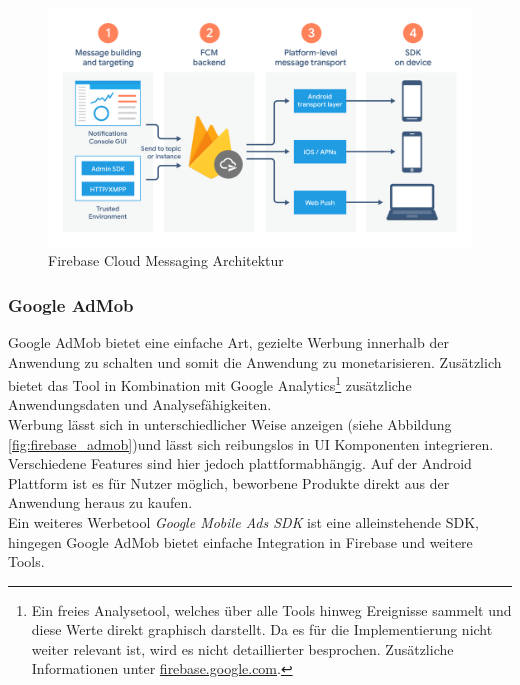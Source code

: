 \begin{figure}[htb]
	\begin{center}
		\includegraphics[scale=0.23]{Theoretische_Grundlagen/images/firebase_cloudmessaging_architecture.png}
	\end{center}
	\caption{Firebase Cloud Messaging Architektur}
	\label{fig:cloudmessaging_architecture}
\end{figure}

\subsubsection{Google AdMob}
Google AdMob bietet eine einfache Art, gezielte Werbung innerhalb der Anwendung zu schalten und somit die Anwendung zu monetarisieren.
Zusätzlich bietet das Tool in Kombination mit Google Analytics\footnote{Ein freies Analysetool, welches über alle Tools hinweg Ereignisse sammelt und diese Werte direkt graphisch darstellt. Da es für die Implementierung nicht weiter relevant ist, wird es nicht detaillierter besprochen. Zusätzliche Informationen unter \href{https://firebase.google.com/docs/analytics}{firebase.google.com}.} zusätzliche Anwendungsdaten und Analysefähigkeiten.\\
Werbung lässt sich in unterschiedlicher Weise anzeigen (siehe Abbildung \ref{fig:firebase_admob})und lässt sich reibungslos in UI Komponenten integrieren. 
Verschiedene Features sind hier jedoch plattformabhängig. 
Auf der Android Plattform ist es für Nutzer möglich, beworbene Produkte direkt aus der Anwendung heraus zu kaufen.\\
Ein weiteres Werbetool \textit{Google Mobile Ads SDK} ist eine alleinstehende SDK, hingegen Google AdMob bietet einfache Integration in Firebase und weitere Tools.\cite{firebase2021}

